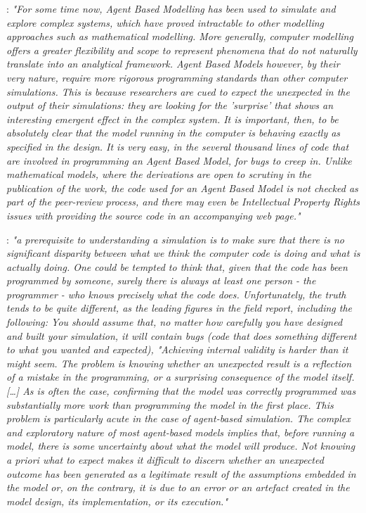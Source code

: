 
\cite{polhill_ghost_2005}: \textit{"For some time now, Agent Based Modelling has been used to simulate and explore complex systems, which have proved intractable to other modelling approaches such as mathematical modelling. More generally, computer modelling offers a greater flexibility and scope to represent phenomena that do not naturally translate into an analytical framework. Agent Based Models however, by their very nature, require more rigorous programming standards than other computer simulations. This is because researchers are cued to expect the unexpected in the output of their simulations: they are looking for the 'surprise' that shows an interesting emergent effect in the complex system. It is important, then, to be absolutely clear that the model running in the computer is behaving exactly as specified in the design. It is very easy, in the several thousand lines of code that are involved in programming an Agent Based Model, for bugs to creep in. Unlike mathematical models, where the derivations are open to scrutiny in the publication of the work, the code used for an Agent Based Model is not checked as part of the peer-review process, and there may even be Intellectual Property Rights issues with providing the source code in an accompanying web page."}

\cite{galan_errors_2009}: \textit{"a prerequisite to understanding a simulation is to make sure that there is no significant disparity between what we think the computer code is doing and what is actually doing. One could be tempted to think that, given that the code has been programmed by someone, surely there is always at least one person - the programmer - who knows precisely what the code does. Unfortunately, the truth tends to be quite different, as the leading figures in the field report, including the following: You should assume that, no matter how carefully you have designed and built your simulation, it will contain bugs (code that does something different to what you wanted and expected), "Achieving internal validity is harder than it might seem. The problem is knowing whether an unexpected result is a reflection of a mistake in the programming, or a surprising consequence of the model itself. […] As is often the case, confirming that the model was correctly programmed was substantially more work than programming the model in the first place. This problem is particularly acute in the case of agent-based simulation. The complex and exploratory nature of most agent-based models implies that, before running a model, there is some uncertainty about what the model will produce. Not knowing a priori what to expect makes it difficult to discern whether an unexpected outcome has been generated as a legitimate result of the assumptions embedded in the model or, on the contrary, it is due to an error or an artefact created in the model design, its implementation, or its execution."}

